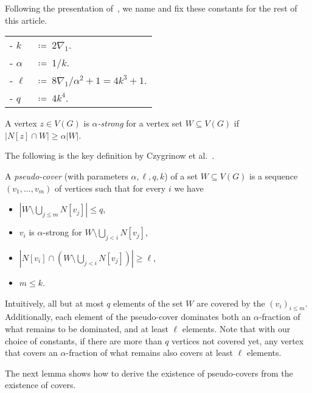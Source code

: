 Following the presentation of~\cite{czygrinow2018distributed}, we name and fix
these constants for the rest of this article.

\begin{tcolorbox}
\begin{tabular}{l l}
- $k$       & $\coloneqq~ 2\nabla_1$.\\
- $\alpha$  & $\coloneqq~ 1/k$.\\
- $\ell$    & $\coloneqq~ 8\nabla_1/\alpha^2+1=4k^3+1$.\\
- $q$       & $\coloneqq~ 4k^4$.
\end{tabular}
\end{tcolorbox}


\begin{definition}
A vertex $z\in V(G)$ is \emph{$\alpha$-strong} for a vertex set $W\subseteq V(G)$ if $|N[z]\cap W|\geq \alpha|W|$.
\end{definition}

The following is the key definition by Czygrinow et al.~\cite{czygrinow2018distributed}.

\begin{definition}
A \emph{pseudo-cover} (with parameters $\alpha, \ell, q, k$)
of a set $W\subseteq V(G)$ is a
sequence $(v_1,\ldots, v_m)$ of vertices
such that  for every $i$ we have
\begin{itemize}
\item $|W\setminus \bigcup_{j\le m}N[v_j]|\leq q$,
\item $v_i$ is $\alpha$-strong for $W\setminus\bigcup_{j<i}N[v_j]$,
\item $|N[v_i]\cap (W\setminus\bigcup_{j<i} N[v_j])|\geq \ell$,
\item $m\leq k$.
\end{itemize}
\end{definition}
Intuitively, all but at most $q$ elements of the set $W$ are covered by the $(v_i)_{i\le m}$.
Additionally, each element of the pseudo-cover dominates both an
$\alpha$-fraction of what remains to be dominated, and at least $\ell$ elements.
Note that with our choice of constants, if there are more than $q$ vertices not
covered yet, any vertex that covers an $\alpha$-fraction of what remains also
covers at least $\ell$ elements.


The next lemma shows how to derive the existence of pseudo-covers from
the existence of covers.

